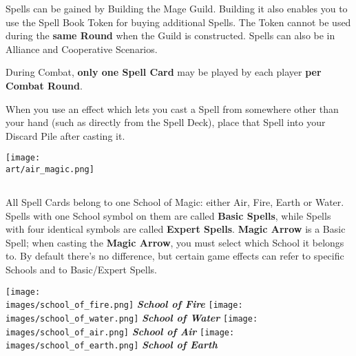 \begin{multicols*}{2}
Spells can be gained by Building the Mage Guild.
Building it also enables you to use the Spell Book Token for buying additional Spells.
The Token cannot be used during the \textbf{same Round} when the Guild is constructed. Spells can also be  in Alliance and Cooperative Scenarios.

During Combat, \textbf{only one Spell Card} may be played by each player \textbf{per Combat Round}.

\columnbreak
When you use an effect which lets you cast a Spell from somewhere other than your hand (such as directly from the Spell Deck), place that Spell into your Discard Pile after casting it.

\begin{center}
  \vspace*{\fill}
  {\texttt{[image: \\art/air\_magic.png]}}
  \vspace*{\fill}
\end{center}

\subsection*{}
All Spell Cards belong to one School of Magic: either Air, Fire, Earth or Water.
Spells with one School symbol on them are called \textbf{Basic Spells}, while Spells with four identical symbols are called \textbf{Expert Spells}.
\textbf{Magic Arrow} is a Basic Spell; when casting the \textbf{Magic Arrow}, you must select which School it belongs to.
By default there's no difference, but certain game effects can refer to specific Schools and to Basic/Expert Spells.

\begin{minipage}[t]{0.48\textwidth}
  \centering
    \centering
    \texttt{[image: \\images/school\_of\_fire.png]}
    \textit{\textbf{\textcolor{darkcandyapplered}{School of Fire}}}
  \endminipage
    \centering
    \texttt{[image: \\images/school\_of\_water.png]}
    \textit{\textbf{\textcolor{darkcandyapplered}{School of Water}}}
  \endminipage
  \hfill\allowbreak%
  \bigbreak
    \centering
    \texttt{[image: \\images/school\_of\_air.png]}
    \textit{\textbf{\textcolor{darkcandyapplered}{School of Air}}}
  \endminipage
    \centering
    \texttt{[image: \\images/school\_of\_earth.png]}
    \textit{\textbf{\textcolor{darkcandyapplered}{School of Earth}}}
  \endminipage
  \bigbreak
\end{minipage}
\clearpage


\end{multicols*}
